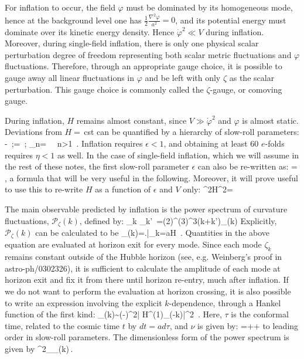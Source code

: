 \documentclass[useAMS,usenatbib,a4paper,onecolumn]{mn2e}
\begin{document}
 For inflation to occur, the field $\varphi$ must be dominated by its homogeneous mode, hence at the background level one has $\frac{1}{2}\frac{\nabla^2\varphi}{a^2}=0$, and its potential energy must dominate over its kinetic energy density. Hence $\dot\varphi^2\ll V$ during inflation. Moreover, during single-field inflation, there is only one physical scalar perturbation degree of freedom representing both scalar metric fluctuations and $\varphi$ fluctuations. Therefore, through an appropriate gauge choice, it is possible to gauge away all linear fluctuations in $\varphi$ and be left with only $\zeta$ as the scalar perturbation. This gauge choice is commonly called the $\zeta$-gauge, or comoving gauge.

During inflation, $H$ remains almost constant, since $V\gg\dot\varphi^2$ and $\varphi$ is almost static. Deviations from $H=\,$cst can be quantified by a hierarchy of slow-roll parameters:
\be
	\epsilon\equiv-\, ;\quad \eta=\, ; \quad \eta_n= ~~n>1\, .
\ee
Inflation requires $\epsilon<1$, and obtaining at least 60 $e$-folds requires $\eta<1$ as well. In the case of single-field inflation, which we will assume in the rest of these notes, the first slow-roll parameter $\epsilon$ can also be re-written as:
\be
	\epsilon=\, ,
\ee
a formula that will be very useful in the following. Moreover, it will prove useful to use this to re-write $H$ as a function of $\epsilon$ and $V$ only:
\be
\label{eq:HnVrel}
	\Mp^2H^2=
\ee

\bigskip
The main observable predicted by inflation is the power spectrum of curvature fluctuations, $\mathcal{P}_\zeta (k)$, defined by:
\be
	\langle \zeta_k \zeta_k'\ \rangle=(2\pi)^{(3)}\delta^3(k+k')_\zeta(k)
\ee
Explicitly, $\mathcal{P}_\zeta (k)$ can be calculated to be
\be
	_\zeta(k)=\left.\right|_{k=aH}\, .
\ee
Quantities in the above equation are evaluated at horizon exit for every mode. Since each mode $\zeta_k$ remains constant outside of the Hubble horizon (see, e.g. Weinberg's proof in astro-ph/0302326), it is sufficient to calculate the amplitude of each mode at horizon exit and fix it from there until horizon re-entry, much after inflation.  If we do not want to perform the evaluation at horizon crossing, it is also possible to write an expression involving the explicit $k$-dependence, through a Hankel function of the first kind:
\be
	_\zeta(k)\sim {}(-\tau)^{2\nu}\left| H^{(1)}_\nu(-k\tau)\right|^2\, .
\ee
Here, $\tau$ is the conformal time, related to the cosmic time $t$ by $dt=ad\tau$, and $\nu$ is given by:
\be
	\nu=+\epsilon+\eta
\ee
to leading order in slow-roll parameters.
The dimensionless form of the power spectrum is given by
\be
	\Delta^2_\xi\equiv{}_\zeta(k)\,.
\ee
\end{document}
